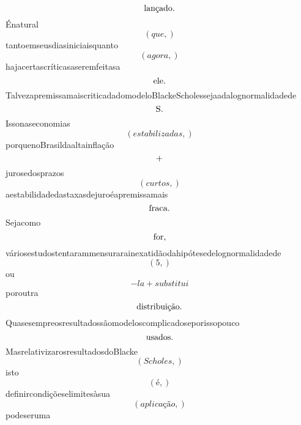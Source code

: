 \documentclass{article}
\begin{document}
\begin{equation}
$lançado.$
\end{equation}Énatural\begin{equation}
\left( que,\right)
\end{equation}tantoemseusdiasiniciaisquanto\begin{equation}
\left( agora,\right)
\end{equation}hajacertascríticasaseremfeitasa\begin{equation}
$ele.$
\end{equation}TalvezapremissamaiscriticadadomodeloBlackeScholessejaadalognormalidadede\begin{equation}
$S.$
\end{equation}Issonaseconomias\begin{equation}
\left( estabilizadas,\right)
\end{equation}porquenoBrasildaaltainflação\begin{equation}
$+$
\end{equation}jurosedosprazos\begin{equation}
\left( curtos,\right)
\end{equation}aestabilidadedastaxasdejuroéapremissamais\begin{equation}
$fraca.$
\end{equation}Sejacomo\begin{equation}
$for,$
\end{equation}váriosestudostentarammensurarainexatidãodahipótesedelognormalidadede\begin{equation}
\left( 5,\right)
\end{equation}ou\begin{equation}
- la + substitui
\end{equation}poroutra\begin{equation}
$distribuição.$
\end{equation}Quasesempreosresultadossãomodeloscomplicadoseporissopouco\begin{equation}
$usados.$
\end{equation}MasrelativizarosresultadosdoBlacke\begin{equation}
\left( Scholes,\right)
\end{equation}isto\begin{equation}
\left( é,\right)
\end{equation}definircondiçõeselimitesàsua\begin{equation}
\left( aplicação,\right)
\end{equation}podeseruma\begin{equation}

\end{equation}
\end{document}
